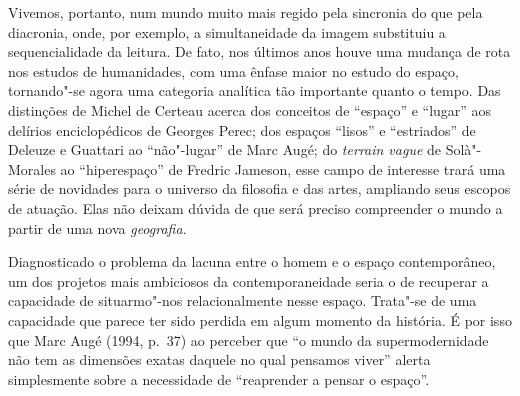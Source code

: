 Vivemos, portanto, num mundo muito mais regido pela sincronia do que
pela diacronia, onde, por exemplo, a simultaneidade da imagem substituiu
a sequencialidade da leitura. De fato, nos últimos anos houve uma
mudança de rota nos estudos de humanidades, com uma ênfase maior no
estudo do espaço, tornando"-se agora uma categoria analítica tão
importante quanto o tempo. Das distinções de Michel de Certeau acerca
dos conceitos de ``espaço'' e ``lugar'' aos delírios
enciclopédicos de Georges Perec; dos espaços ``lisos'' e ``estriados'' de
Deleuze e Guattari ao ``não"-lugar'' de Marc Augé; do \emph{terrain
vague} de Solà"-Morales ao ``hiperespaço'' de Fredric Jameson, esse
campo de interesse trará uma série de novidades para o universo da
filosofia e das artes, ampliando seus escopos de atuação. Elas não
deixam dúvida de que será preciso compreender o mundo a partir de uma
nova \emph{geografia}.

Diagnosticado o problema da lacuna entre o homem e o espaço
contemporâneo, um dos projetos mais ambiciosos da contemporaneidade
seria o de recuperar a capacidade de situarmo"-nos relacionalmente nesse
espaço. Trata"-se de uma capacidade que parece ter sido perdida em algum
momento da história. É por isso que Marc Augé (1994, p.~37) ao perceber que ``o mundo
da supermodernidade não tem as dimensões exatas daquele no qual
pensamos viver'' alerta simplesmente sobre a necessidade de
``reaprender a pensar o espaço''.

